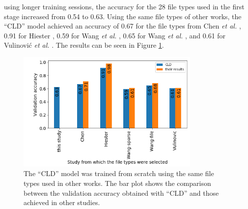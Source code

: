 using longer training sessions, the accuracy for the 28 file types used in the first stage increased from 0.54 to 0.63. Using the same file types of other works, the ``CLD'' model achieved an accuracy of 
0.67 for the file types from Chen \textit{et al.} \cite{chen_file_2018},
0.91 for Hiester \cite{hiester_file_2018}, 
0.59 for Wang \textit{et al.} \cite{wang_sparse_2018},
0.65 for Wang \textit{et al.} \cite{wang_file_2018},
and
0.61 for Vulinović \textit{et al.} \cite{vulinovic_neural_2019}.
The results can be seen in Figure \ref{fig:cldothers}.

\noindent
\begin{figure}[htb!]
\centering\includegraphics[width=0.8\textwidth]{content/CLD-others.png}
\caption[CLD vs. other studies]{\label{fig:cldothers}The ``CLD'' model was trained from scratch using the same file types used in other works. The bar plot shows the comparison between the validation accuracy obtained with ``CLD'' and those achieved in other studies.}%
\end{figure}

